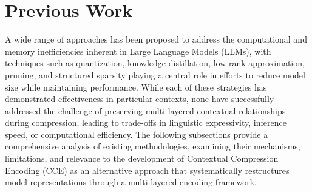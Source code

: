 \section{Previous Work}
A wide range of approaches has been proposed to address the computational and memory inefficiencies inherent in Large Language Models (LLMs), with techniques such as quantization, knowledge distillation, low-rank approximation, pruning, and structured sparsity playing a central role in efforts to reduce model size while maintaining performance. While each of these strategies has demonstrated effectiveness in particular contexts, none have successfully addressed the challenge of preserving multi-layered contextual relationships during compression, leading to trade-offs in linguistic expressivity, inference speed, or computational efficiency. The following subsections provide a comprehensive analysis of existing methodologies, examining their mechanisms, limitations, and relevance to the development of Contextual Compression Encoding (CCE) as an alternative approach that systematically restructures model representations through a multi-layered encoding framework. 

